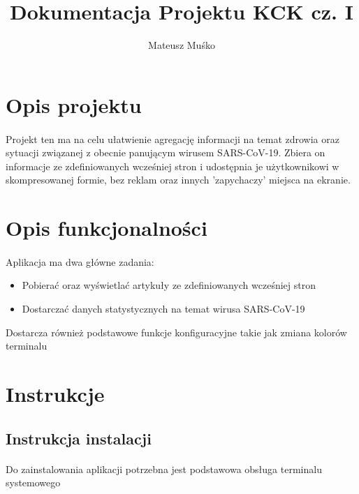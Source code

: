 \documentclass{article}
\author{Mateusz Muśko}
\title{Dokumentacja Projektu KCK cz. I}
\begin{document}
\maketitle
\tableofcontents

\section{Opis projektu}

\paragraph{}

Projekt ten ma na celu ułatwienie agregację informacji na temat zdrowia oraz sytuacji związanej z 
obecnie panującym wirusem SARS-CoV-19. Zbiera on informacje ze zdefiniowanych wcześniej stron i udostępnia je 
użytkownikowi w skompresowanej formie, bez reklam oraz innych 'zapychaczy' miejsca na ekranie.

\section{Opis funkcjonalności}

\paragraph{}
Aplikacja ma dwa główne zadania:
\begin{itemize}
    \item Pobierać oraz wyświetlać artykuły ze zdefiniowanych wcześniej stron
    \item Dostarczać danych statystycznych na temat wirusa SARS-CoV-19
\end{itemize}
Dostarcza również podstawowe funkcje konfiguracyjne takie jak zmiana kolorów terminalu

\section{Instrukcje}

\subsection{Instrukcja instalacji}

\paragraph{}
Do zainstalowania aplikacji potrzebna jest podstawowa obsługa terminalu systemowego
\end{document}
